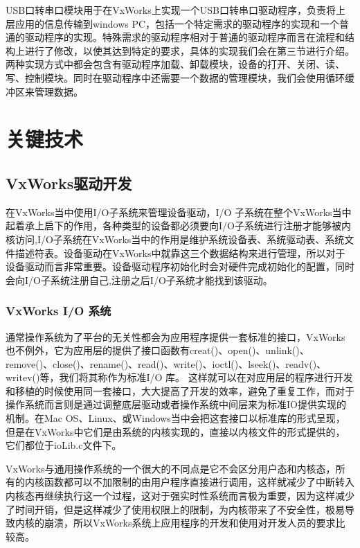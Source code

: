 	USB口转串口模块用于在VxWorks上实现一个USB口转串口驱动程序，负责将上层应用的信息传输到windows PC，包括一个特定需求的驱动程序的实现和一个普通的驱动程序的实现。特殊需求的驱动程序相对于普通的驱动程序而言在流程和结构上进行了修改，以使其达到特定的要求，具体的实现我们会在第三节进行介绍。两种实现方式中都会包含有驱动程序加载、卸载模块，设备的打开、关闭、读、写、控制模块。同时在驱动程序中还需要一个数据的管理模块，我们会使用循环缓冲区来管理数据。


\section{关键技术}

\subsection{VxWorks驱动开发}
	
	在VxWorks当中使用I/O子系统来管理设备驱动，I/O 子系统在整个VxWorks当中起着承上启下的作用，各种类型的设备都必须要向I/O子系统进行注册才能够被内核访问,I/O子系统在VxWorks当中的作用是维护系统设备表、系统驱动表、系统文件描述符表\cite{VxWorks内核解读}\cite{曹桂平2011VxWorks}。设备驱动在VxWorks中就靠这三个数据结构来进行管理，所以对于设备驱动而言非常重要。设备驱动程序初始化时会对硬件完成初始化的配置，同时会向I/O子系统注册自己,注册之后I/O子系统才能找到该驱动。

\subsubsection{VxWorks I/O 系统}
	通常操作系统为了平台的无关性都会为应用程序提供一套标准的接口，VxWorks也不例外，它为应用层的提供了接口函数有creat()、open()、unlink()、remove()、close()、rename()、read()、write()、ioctl()、lseek()、readv()、writev()等\cite{陈洋2007VxWorks}\cite{Wu2008Implementation}\cite{Zhang2010Design}，我们将其称作为标准I/O 库。
	这样就可以在对应用层的程序进行开发和移植的时候使用同一套接口，大大提高了开发的效率，避免了重复工作，而对于操作系统而言则是通过调整底层驱动或者操作系统中间层来为标准IO提供实现的机制。在Mac OS、Linux、或Windows当中会把这套接口以标准库的形式呈现，但是在VxWorks中它们是由系统的内核实现的，直接以内核文件的形式提供的，它们都位于ioLib.c文件下\cite{VxWorks内核解读}。
	
	VxWorks与通用操作系统的一个很大的不同点是它不会区分用户态和内核态，所有的内核函数都可以不加限制的由用户程序直接进行调用，这样就减少了中断转入内核态再继续执行这一个过程，这对于强实时性系统而言极为重要，因为这样减少了时间开销，但是这样减少了使用权限上的限制，为内核带来了不安全性，极易导致内核的崩溃，所以VxWorks系统上应用程序的开发和使用对开发人员的要求比较高。
		
